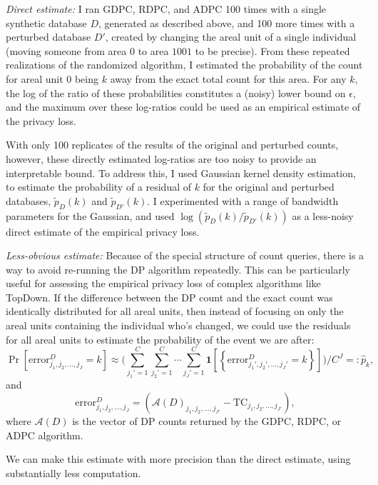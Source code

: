\documentclass{article}
\begin{document}
\emph{Direct estimate:} I ran GDPC, RDPC, and ADPC 100 times with a single synthetic database $D$, generated as described above, and 100 more times with a perturbed database $D'$, created by changing the areal unit of a single individual (moving someone from area $0$ to area $1001$ to be precise). From these repeated realizations of the randomized algorithm, I estimated the probability of the count for areal unit $0$ being $k$ away from the exact total count for this area.  For any $k$, the log of the ratio of these probabilities constitutes a (noisy) lower bound on $\epsilon$, and the maximum over these log-ratios could be used as an empirical estimate of the privacy loss.

With only 100 replicates of the results of the original and perturbed counts, however, these directly estimated log-ratios are too noisy to provide an interpretable bound.  To address this, I used Gaussian kernel density estimation, to estimate the probability of a residual of $k$ for the original and perturbed databases, $\tilde{p}_D(k)$ and $\tilde{p}_{D'}(k)$.  I experimented with a range of bandwidth parameters for the Gaussian, and used $\log\left( \tilde{p}_D(k) / \tilde{p}_{D'}(k)\right)$ as a less-noisy direct estimate of the empirical privacy loss.

\emph{Less-obvious estimate:} Because of the special structure of count queries, there is a way to avoid re-running the DP algorithm repeatedly.  This can be particularly useful for assessing the empirical privacy loss of complex algorithms like TopDown. If the difference between the DP count and the exact count was identically distributed for all areal units, then instead of focusing on only the areal units containing the individual who's changed, we could use the residuals for all areal units to estimate the probability of the event we are after:
$$\Pr\left[\mathrm{error}_{j_1, j_2, \ldots, j_{J}}^D
= k\right]
\approx
\bigg(\sum_{j_1'=1}^C\sum_{j_2'=1}^C\cdots\sum_{j_J' = 1}^C \mathbf{1}\left[\left\{\mathrm{error}_{j_1', j_2', \ldots, j_{J}'}^D
= k\right\}\right]\bigg)\bigg/C^J =: \hat{p}_k,
$$
and $$\mathrm{error}_{j_1, j_2, \ldots, j_{J}}^D = \left(\mathcal{A}(D)_{j_1, j_2, \ldots, j_{J'}}
- \mathrm{TC}_{j_1, j_2, \ldots, j_{J'}}\right),$$
where $\mathcal{A}(D)$ is the vector of DP counts returned by the GDPC, RDPC, or ADPC algorithm.

We can make this estimate with more precision than the direct estimate, using substantially less computation.
\end{document}
